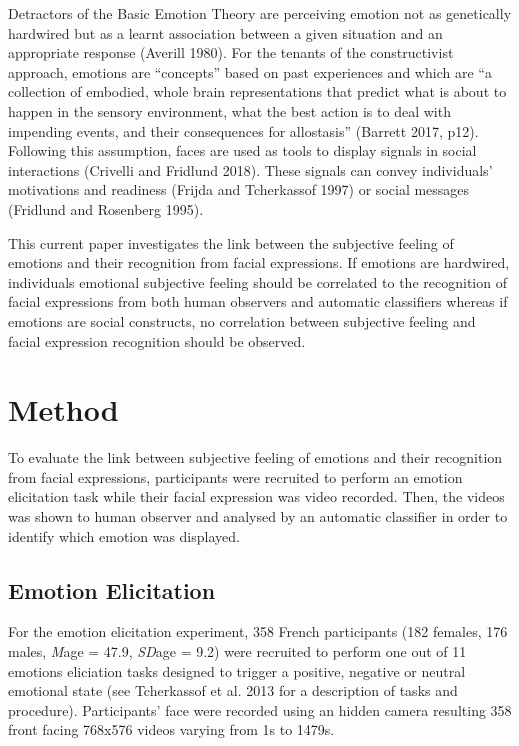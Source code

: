 \documentclass[conference,final,]{IEEEtran}
\begin{document}
Detractors of the Basic Emotion Theory are perceiving emotion not as
genetically hardwired but as a learnt association between a given
situation and an appropriate response (Averill 1980). For the tenants of
the constructivist approach, emotions are ``concepts'' based on past
experiences and which are ``a collection of embodied, whole brain
representations that predict what is about to happen in the sensory
environment, what the best action is to deal with impending events, and
their consequences for allostasis'' (Barrett 2017, p12). Following this
assumption, faces are used as tools to display signals in social
interactions (Crivelli and Fridlund 2018). These signals can convey
individuals' motivations and readiness (Frijda and Tcherkassof 1997) or
social messages (Fridlund and Rosenberg 1995).

This current paper investigates the link between the subjective feeling
of emotions and their recognition from facial expressions. If emotions
are hardwired, individuals emotional subjective feeling should be
correlated to the recognition of facial expressions from both human
observers and automatic classifiers whereas if emotions are social
constructs, no correlation between subjective feeling and facial
expression recognition should be observed.

\hypertarget{method}{%
\section{Method}\label{method}}

To evaluate the link between subjective feeling of emotions and their
recognition from facial expressions, participants were recruited to
perform an emotion elicitation task while their facial expression was
video recorded. Then, the videos was shown to human observer and
analysed by an automatic classifier in order to identify which emotion
was displayed.

\hypertarget{emotion-elicitation}{%
\subsection{Emotion Elicitation}\label{emotion-elicitation}}

For the emotion elicitation experiment, 358 French participants (182
females, 176 males, \emph{M}age = 47.9, \emph{SD}age = 9.2) were
recruited to perform one out of 11 emotions eliciation tasks designed to
trigger a positive, negative or neutral emotional state (see Tcherkassof
et al. 2013 for a description of tasks and procedure). Participants'
face were recorded using an hidden camera resulting 358 front facing
768x576 videos varying from 1s to 1479s.
\end{document}
